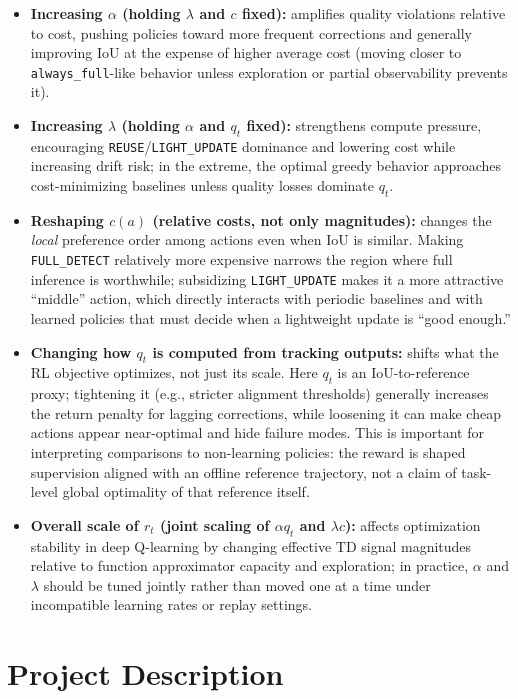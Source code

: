 \documentclass[letterpaper]{article}
\begin{document}
\begin{itemize}[leftmargin=1.2em]
    \item \textbf{Increasing $\alpha$ (holding $\lambda$ and $c$ fixed):} amplifies quality violations relative to cost, pushing policies toward more frequent corrections and generally improving IoU at the expense of higher average cost (moving closer to \texttt{always\_full}-like behavior unless exploration or partial observability prevents it).
    \item \textbf{Increasing $\lambda$ (holding $\alpha$ and $q_t$ fixed):} strengthens compute pressure, encouraging \texttt{REUSE}/\texttt{LIGHT\_UPDATE} dominance and lowering cost while increasing drift risk; in the extreme, the optimal greedy behavior approaches cost-minimizing baselines unless quality losses dominate $q_t$.
    \item \textbf{Reshaping $c(a)$ (relative costs, not only magnitudes):} changes the \emph{local} preference order among actions even when IoU is similar. Making \texttt{FULL\_DETECT} relatively more expensive narrows the region where full inference is worthwhile; subsidizing \texttt{LIGHT\_UPDATE} makes it a more attractive ``middle'' action, which directly interacts with periodic baselines and with learned policies that must decide when a lightweight update is ``good enough.''
    \item \textbf{Changing how $q_t$ is computed from tracking outputs:} shifts what the RL objective optimizes, not just its scale. Here $q_t$ is an IoU-to-reference proxy; tightening it (e.g., stricter alignment thresholds) generally increases the return penalty for lagging corrections, while loosening it can make cheap actions appear near-optimal and hide failure modes. This is important for interpreting comparisons to non-learning policies: the reward is shaped supervision aligned with an offline reference trajectory, not a claim of task-level global optimality of that reference itself.
    \item \textbf{Overall scale of $r_t$ (joint scaling of $\alpha q_t$ and $\lambda c$):} affects optimization stability in deep Q-learning by changing effective TD signal magnitudes relative to function approximator capacity and exploration; in practice, $\alpha$ and $\lambda$ should be tuned jointly rather than moved one at a time under incompatible learning rates or replay settings.
\end{itemize}

\section{Project Description}
\label{sec:method}
\end{document}
